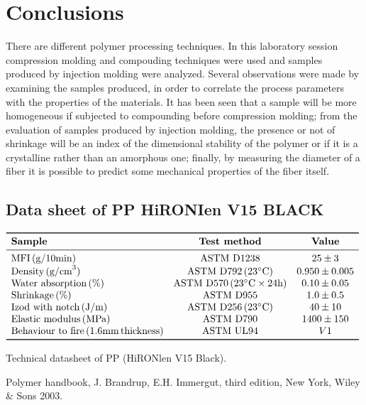 \documentclass[a4paper, 11pt]{article}
\begin{document}
\section{Conclusions}


There are different polymer processing techniques. In this laboratory session compression molding and compouding techniques were used and samples produced by injection molding were analyzed.
Several observations were made by examining the samples produced, in order to correlate the process parameters with the properties of the materials.
It has been seen that a sample will be more homogeneous if subjected to compounding before compression molding; from the evaluation of samples produced by injection molding, the presence or not of shrinkage will be an index of the dimensional stability of the polymer or if it is a crystalline rather than an amorphous one; finally, by measuring the diameter of a fiber it is possible to predict some mechanical properties of the fiber itself.
\newpage

\begin{appendices}
\section{Data sheet of PP HiRONIen V15 BLACK}


\begin{table}[htp]
\centering
$
\begin{array}{lcc}
\toprule
\textbf{Sample} & \textbf{Test method} & \textbf{Value}\\
\midrule

\text{MFI}\,\text{(g/10min)} & \text{ASTM D}{1238} & 25 \pm 3 \\
\text{Density}\,\text{(g/cm}^3) & \text{ASTM D}{792}\, {(23^\circ\text{C})} & 0.950 \pm 0.005 \\
\text{Water absorption}\, (\%) & \text{ASTM D}{570}\, (23^\circ \text{C} \times 24\text{h}) & 0.10 \pm 0.05 \\
\text{Shrinkage}\, ({\%}) & \text{ASTM D}{955} & 1.0 \pm 0.5 \\
\text{Izod with notch}\, \text{(J/m)} & \text{ASTM D}{256}\,(23^\circ \text{C}) & 40 \pm 10 \\
\text{Elastic modulus}\, \text{(MPa)} & \text{ASTM D}{790}& 1400 \pm 150 \\
\text{Behaviour to fire}\, (1.6 \text{mm}\,\text{thickness)} & \text{ASTM UL}{94} & V1 \\
\bottomrule
\end{array}
$
\caption{Technical datasheet of PP (HiRONlen V15 Black).}
\label{tab:flame}
\end{table}
\end{appendices}

\newpage
\begin{thebibliography}{1}

 Polymer handbook, J. Brandrup, E.H. Immergut, third edition, New York, Wiley \& Sons 2003.
\end{thebibliography}
\end{document}
